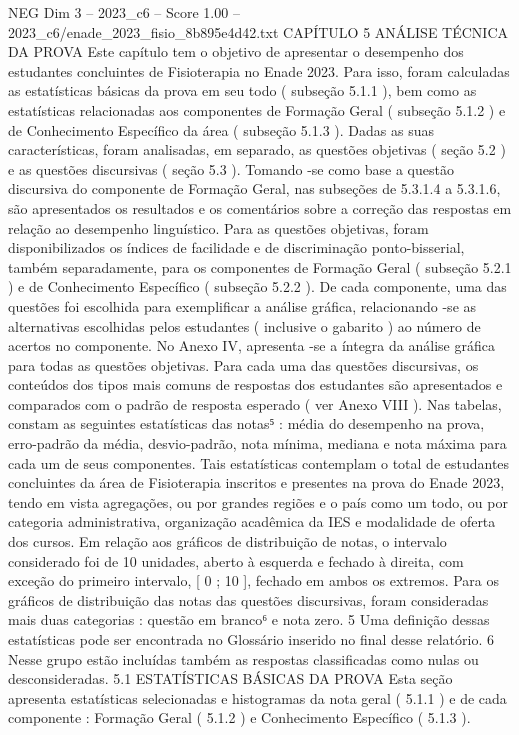 \begin{textsample}{NEG Dim 3 – 2023\_c6 – Score 1.00 – 2023\_c6/enade\_2023\_fisio\_8b895e4d42.txt}  \label{ex:f3_neg_175}
CAPÍTULO 5 ANÁLISE TÉCNICA DA PROVA Este capítulo tem o objetivo de apresentar o desempenho dos estudantes concluintes de Fisioterapia no Enade 2023.
Para isso, foram calculadas as estatísticas básicas da prova em seu todo ( subseção 5.1.1 ), bem como as estatísticas relacionadas aos componentes de Formação Geral ( subseção 5.1.2 ) e de Conhecimento Específico da área ( subseção 5.1.3 ).
Dadas as suas características, foram analisadas, em separado, as questões objetivas ( seção 5.2 ) e as questões discursivas ( seção 5.3 ).
Tomando -se como base a questão discursiva do componente de Formação Geral, nas subseções de 5.3.1.4 a 5.3.1.6, são apresentados os resultados e os comentários sobre a correção das respostas em relação ao desempenho linguístico.
Para as questões objetivas, foram disponibilizados os índices de facilidade e de discriminação ponto-bisserial, também separadamente, para os componentes de Formação Geral ( subseção 5.2.1 ) e de Conhecimento Específico ( subseção 5.2.2 ).
De cada componente, uma das questões foi escolhida para exemplificar a análise gráfica, relacionando -se as alternativas escolhidas pelos estudantes ( inclusive o gabarito ) ao número de acertos no componente.
No Anexo IV, apresenta -se a íntegra da análise gráfica para todas as questões objetivas.
Para cada uma das questões discursivas, os conteúdos dos tipos mais comuns de respostas dos estudantes são apresentados e comparados com o padrão de resposta esperado ( ver Anexo VIII ).
Nas tabelas, constam as seguintes estatísticas das notas⁵ : média do desempenho na prova, erro-padrão da média, desvio-padrão, nota mínima, mediana e nota máxima para cada um de seus componentes.
Tais estatísticas contemplam o total de estudantes concluintes da área de Fisioterapia inscritos e presentes na prova do Enade 2023, tendo em vista agregações, ou por grandes regiões e o país como um todo, ou por categoria administrativa, organização acadêmica da IES e modalidade de oferta dos cursos.
Em relação aos gráficos de distribuição de notas, o intervalo considerado foi de 10 unidades, aberto à esquerda e fechado à direita, com exceção do primeiro intervalo, [ 0 ; 10 ], fechado em ambos os extremos.
Para os gráficos de distribuição das notas das questões discursivas, foram consideradas mais duas categorias : questão em branco⁶ e nota zero. 5 Uma definição dessas estatísticas pode ser encontrada no Glossário inserido no final desse relatório. 6 Nesse grupo estão incluídas também as respostas classificadas como nulas ou desconsideradas. 5.1 ESTATÍSTICAS BÁSICAS DA PROVA Esta seção apresenta estatísticas selecionadas e histogramas da nota geral ( 5.1.1 ) e de cada componente : Formação Geral ( 5.1.2 ) e Conhecimento Específico ( 5.1.3 ).

\end{textsample}
